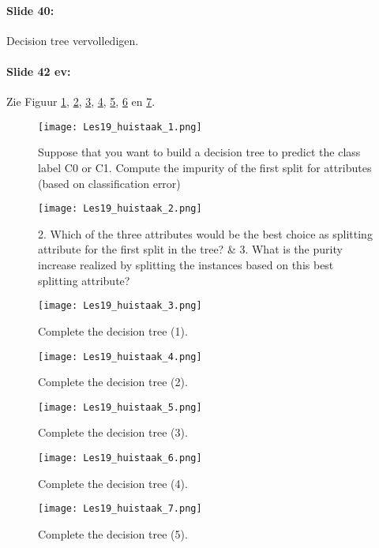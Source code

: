 \documentclass[10pt,a4paper]{report}
\begin{document}
\paragraph{Slide 40:}Decision tree vervolledigen.

\paragraph{Slide 42 ev:}Zie Figuur \ref{19_h_1}, \ref{19_h_2}, \ref{19_h_3}, \ref{19_h_4}, \ref{19_h_5}, \ref{19_h_6} en \ref{19_h_7}.

\begin{figure}[ht!]
\centering
\texttt{[image: Les19\_huistaak\_1.png]}
\caption{Suppose that you want to build a decision tree to predict the class label C0 or C1. Compute the impurity of the first split for attributes (based on classification error) \label{19_h_1}}
\end{figure}

\begin{figure}[ht!]
\centering
\texttt{[image: Les19\_huistaak\_2.png]}
\caption{2. Which of the three attributes would be the best choice as splitting attribute for the first split in the tree? \& 3. What is the purity increase realized by splitting the instances based on this best splitting attribute? \label{19_h_2}}
\end{figure}

\begin{figure}[ht!]
\centering
\texttt{[image: Les19\_huistaak\_3.png]}
\caption{Complete the decision tree (1). \label{19_h_3}}
\end{figure}

\begin{figure}[ht!]
\centering
\texttt{[image: Les19\_huistaak\_4.png]}
\caption{Complete the decision tree (2). \label{19_h_4}}
\end{figure}

\begin{figure}[ht!]
\centering
\texttt{[image: Les19\_huistaak\_5.png]}
\caption{Complete the decision tree (3). \label{19_h_5}}
\end{figure}

\begin{figure}[ht!]
\centering
\texttt{[image: Les19\_huistaak\_6.png]}
\caption{Complete the decision tree (4). \label{19_h_6}}
\end{figure}

\begin{figure}[ht!]
\centering
\texttt{[image: Les19\_huistaak\_7.png]}
\caption{Complete the decision tree (5). \label{19_h_7}}
\end{figure}
\end{document}
